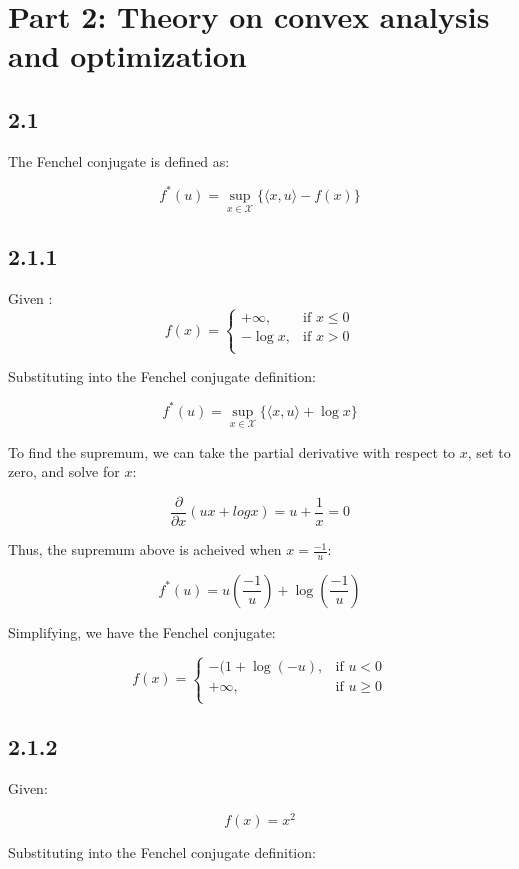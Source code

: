 \documentclass[12pt]{article}
\begin{document}
\newpage
\section*{Part 2: Theory on convex analysis and optimization}
\subsection*{2.1}

The Fenchel conjugate is defined as:

\[f^*(u) = \sup_{x\in \mathcal{X}} \{ \langle x, u\rangle - f(x) \}\]

\subsection*{2.1.1}

Given :
\[ f(x) = \begin{cases}
      +\infty, & \text{if } x \leq 0 \\
      -\log x, & \text{if } x > 0 \\
   \end{cases}\]

Substituting into the Fenchel conjugate definition:

\[f^*(u) = \sup_{x\in \mathcal{X}} \{ \langle x, u\rangle +  \log x \}\]

To find the supremum, we can take the partial derivative with respect to $x$, set to zero, and solve for $x$:

\[\frac{\partial}{\partial x}(ux + logx) = u + \frac{1}{x} = 0\]

Thus, the supremum above is acheived when $x=\frac{-1}{u}$:

\[f^*(u) = u \left(\frac{-1}{u} \right) +  \log\left(\frac{-1}{u} \right) \]

Simplifying, we have the Fenchel conjugate:

\[ f(x) = \begin{cases}
      - (1 + \log (-u), & \text{if } u < 0 \\
      +\infty, & \text{if } u \geq 0 \\
   \end{cases}\]


\subsection*{2.1.2} Given:

\[f(x) = x^2\]

Substituting into the Fenchel conjugate definition:
\end{document}
